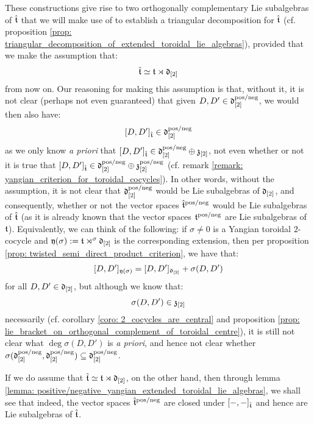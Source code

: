         \begin{remark}[Why must we work only with $\extendedtoroidal := \toroidal \rtimes \d_{[2]}$ ?] \label{remark: why_yangian_toroidal_semi_direct_product}
            These constructions give rise to two orthogonally complementary Lie subalgebras of $\hat{\mathfrak{t}}$ that we will make use of to establish a triangular decomposition for $\hat{\mathfrak{t}}$ (cf. proposition \ref{prop: triangular_decomposition_of_extended_toroidal_lie_algebras}), provided that we make the assumption that:
                $$\hat{\mathfrak{t}} \simeq \mathfrak{t} \rtimes \mathfrak{d}_{[2]}$$
            from now on. Our reasoning for making this assumption is that, without it, it is not clear (perhaps not even guaranteed) that given $D, D' \in \mathfrak{d}_{[2]}^{\mathrm{pos}/\mathrm{neg}}$, we would then also have:
                $$[D, D']_{\hat{\mathfrak{t}}} \in \mathfrak{d}_{[2]}^{\mathrm{pos}/\mathrm{neg}}$$
            as we only know \textit{a priori} that $[D, D']_{\hat{\mathfrak{t}}} \in \mathfrak{d}_{[2]}^{\mathrm{pos}/\mathrm{neg}} \oplus \mathfrak{z}_{[2]}$, not even whether or not it is true that $[D, D']_{\hat{\mathfrak{t}}} \in \mathfrak{d}_{[2]}^{\mathrm{pos}/\mathrm{neg}} \oplus \mathfrak{z}_{[2]}^{\mathrm{pos}/\mathrm{neg}}$ (cf. remark \ref{remark: yangian_criterion_for_toroidal_cocycles}). In other words, without the assumption, it is not clear that $\mathfrak{d}_{[2]}^{\mathrm{pos}/\mathrm{neg}}$ would be Lie subalgebras of $\mathfrak{d}_{[2]}$, and consequently, whether or not the vector spaces $\hat{\mathfrak{t}}^{\mathrm{pos}/\mathrm{neg}}$ would be Lie subalgebras of $\hat{\mathfrak{t}}$ (as it is already known that the vector spaces $\mathfrak{t}^{\mathrm{pos}/\mathrm{neg}}$ are Lie subalgebras of $\mathfrak{t}$). Equivalently, we can think of the following: if $\sigma \not = 0$ is a Yangian toroidal $2$-cocycle and $\mathfrak{y}(\sigma) := \mathfrak{t} \rtimes^{\sigma} \mathfrak{d}_{[2]}$ is the corresponding extension, then per proposition \ref{prop: twisted_semi_direct_product_criterion}, we have that:
                $$[D, D']_{\mathfrak{y}(\sigma)} = [D, D']_{\mathfrak{d}_{[2]}} + \sigma(D, D')$$
            for all $D, D' \in \mathfrak{d}_{[2]}$, but although we know that:
                $$\sigma(D, D') \in \mathfrak{z}_{[2]}$$
            necessarily (cf. corollary \ref{coro: 2_cocycles_are_central} and proposition \ref{prop: lie_bracket_on_orthogonal_complement_of_toroidal_centre}), it is still not clear what $\deg \sigma(D, D')$ is \textit{a priori}, and hence not clear whether $\sigma(\mathfrak{d}_{[2]}^{\mathrm{pos}/\mathrm{neg}}, \mathfrak{d}_{[2]}^{\mathrm{pos}/\mathrm{neg}}) \subseteq \mathfrak{d}_{[2]}^{\mathrm{pos}/\mathrm{neg}}$.
            
            If we do assume that $\hat{\mathfrak{t}} \simeq \mathfrak{t} \rtimes \mathfrak{d}_{[2]}$, on the other hand, then through lemma \ref{lemma: positive/negative_yangian_extended_toroidal_lie_algebras}, we shall see that indeed, the vector spaces $\hat{\mathfrak{t}}^{\mathrm{pos}/\mathrm{neg}}$ are closed under $[-, -]_{\hat{\mathfrak{t}}}$ and hence are Lie subalgebras of $\hat{\mathfrak{t}}$. 
        \end{remark}
        
